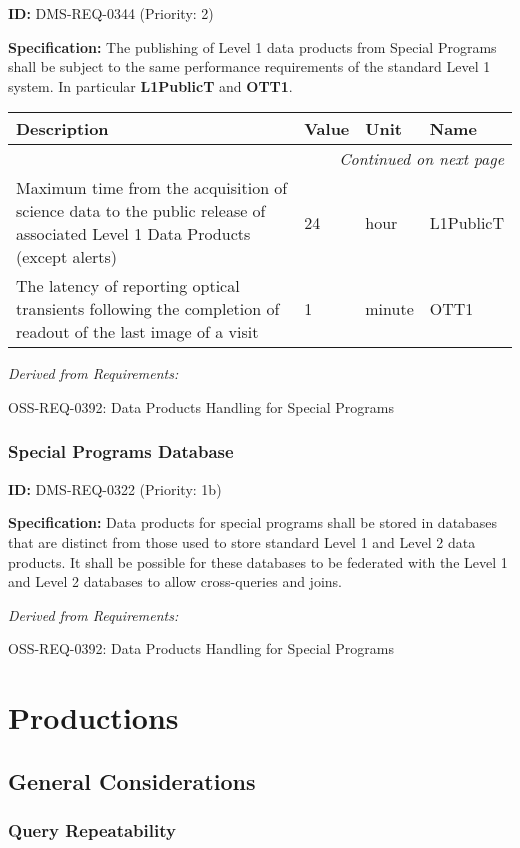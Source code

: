 \documentclass[SE,toc,lsstdraft]{lsstdoc}
\makeatletter
\newcommand{\paramname}[1]{\hspace{0pt}#1}
\newcommand{\unitname}[1]{\hspace{0pt}#1}
\newenvironment{parameters}[0]{%
\setlength\LTleft{0pt}
\setlength\LTright{\fill}
\begin{small}
\begin{longtable}[]{|p{0.49\textwidth}|l|p{0.6in}|p{1.70in}@{}|}

\hline \textbf{Description} & \textbf{Value} & \textbf{Unit} & \textbf{Name} \\ \hline
\endhead

\hline \multicolumn{4}{r}{\emph{Continued on next page}} \\
\endfoot

\hline\hline
\endlastfoot
}{%
\hline
\end{longtable}
\end{small}
}
\makeatother
\begin{document}
\label{DMS-REQ-0344}
\textbf{ID:} DMS-REQ-0344 (Priority: 2)

\textbf{Specification: }The publishing of Level 1 data products from Special Programs shall be subject to the same performance requirements of the standard Level 1 system. In particular \textbf{L1PublicT} and \textbf{OTT1}.

\begin{parameters}
Maximum time from the acquisition of science data to the public release of associated Level 1 Data Products (except alerts)
&
24
&
\unitname{%
hour
}
&
\paramname{%
L1PublicT
} \\\hline
The latency of reporting optical transients following the completion of readout of the last image of a visit
&
1
&
\unitname{%
minute
}
&
\paramname{%
OTT1
} \\\hline
\end{parameters}

\emph{Derived from Requirements:}

OSS-REQ-0392:
Data Products Handling for Special Programs \newline

\subsubsection{Special Programs Database}

\label{DMS-REQ-0322}
\textbf{ID:} DMS-REQ-0322 (Priority: 1b)

\textbf{Specification:} Data products for special programs shall be stored in databases that are distinct from those used to store standard Level 1 and Level 2 data products. It shall be possible for these databases to be federated with the Level 1 and Level 2 databases to allow cross-queries and joins.

\emph{Derived from Requirements:}

OSS-REQ-0392:
Data Products Handling for Special Programs \newline

\section{Productions}

\subsection{General Considerations}

\subsubsection{Query Repeatability}
\end{document}
